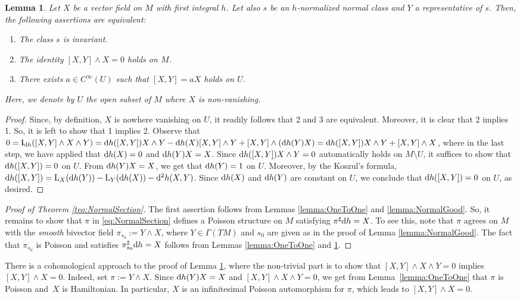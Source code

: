 \documentclass[pdftex]{sigma}%
\newcommand{\dd}{{\rm d}}
\newcommand{\ii}{\mathbf{i}}
\numberwithin{equation}{section}
\newtheorem{Lemma}[Theorem]{Lemma}
\begin{document}
\begin{Lemma}\label{lemma:NormalInv}
Let $X$ be a vector field on $M$ with first integral $h$. Let also $s$ be an $h$-normalized normal class and $Y$ a representative of $s$. Then, the following assertions are equivalent:
 \begin{enumerate}\itemsep=0pt
 \item[$1.$] The class $s$ is invariant.
 \item[$2.$] The identity $[X,Y]\wedge X = 0$ holds on $M$.
 \item[$3.$] There exists $a \in C^{\infty}(U)$ such that $[X,Y] = aX$ holds on $U$.
 \end{enumerate}
Here, we denote by $U$ the open subset of $M$ where $X$ is non-vanishing.
\end{Lemma}
\begin{proof}
Since, by definition, $X$ is nowhere vanishing on $U$, it readily follows that 2 and 3 are equivalent. Moreover, it is clear that 2 implies 1. So, it is left to show that 1 implies 2. Observe that $0 = \ii_{\dd h}([X,Y]\wedge X\wedge Y) = \dd h([X,Y]) X\wedge Y - \dd h(X)[X,Y]\wedge Y + [X,Y]\wedge(\dd h(Y)X) = \dd h([X,Y]) X\wedge Y + [X,Y]\wedge X$, where in the last step, we have applied that $\dd h(X) = 0$ and $\dd h(Y)X = X$. Since $\dd h([X,Y]) X \wedge Y = 0$ automatically holds on $M \setminus U$, it suffices to show that $\dd h([X,Y]) = 0$ on $U$. From $\dd h(Y)X = X$, we get that $\dd h(Y) = 1$ on $U$. Moreover, by the Koszul's formula, $\dd h([X,Y]) = {\rm L}_{X}(\dd h(Y)) - {\rm L}_{Y}(\dd h(X)) - \dd^2h(X,Y)$. Since $\dd h(X)$ and $\dd h(Y)$ are constant on $U$, we conclude that $\dd h([X,Y]) = 0$ on $U$, as desired.
\end{proof}

\begin{proof}[Proof of Theorem \ref{teo:NormalSection}]
The first assertion follows from Lemmas \ref{lemma:OneToOne} and \ref{lemma:NormalGood}. So, it remains to show that $\pi$ in \eqref{eq:NormalSection} defines a Poisson structure on $M$ satisfying $\pi^{\sharp}\dd h=X$. To see this, note that $\pi$ agrees on $M$ with the \emph{smooth} bivector field $\pi_{s_0}:=Y\wedge X$, where $Y\in\Gamma(TM)$ and $s_0$ are given as in the proof of Lemma \ref{lemma:NormalGood}. The fact that $\pi_{s_0}$ is Poisson and satisfies $\pi^{\sharp}_{s_0}\dd h=X$ follows from Lemmas \ref{lemma:OneToOne} and \ref{lemma:NormalInv}.
\end{proof}

\begin{Remark}
There is a cohomological approach to the proof of Lemma \ref{lemma:NormalInv}, where the non-trivial part is to show that $[X,Y] \wedge X \wedge Y = 0$ implies $[X,Y] \wedge X = 0$. Indeed, set $\pi := Y \wedge X$. Since $\dd h(Y)X = X$ and $[X,Y] \wedge X \wedge Y = 0$, we get from Lemma~\ref{lemma:OneToOne} that $\pi$ is Poisson and~$X$ is Hamiltonian. In particular, $X$ is an infinitesimal Poisson automorphism for $\pi$, which leads to $[X,Y] \wedge X = 0$.
\end{Remark}
\end{document}
